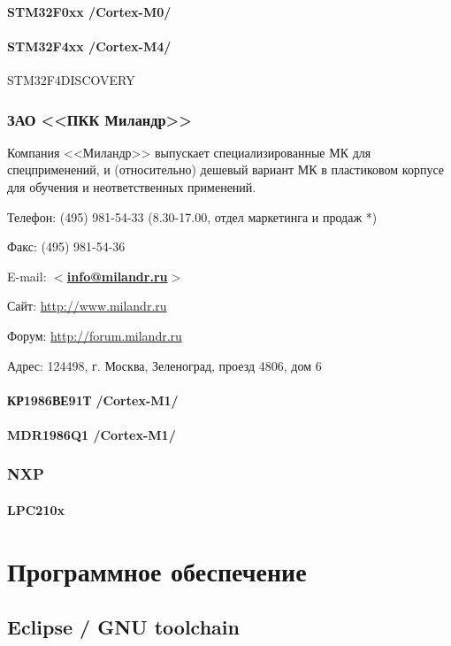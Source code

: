 \documentclass[oneside,12pt]{book}
\newcommand{\cm}[1]{Cortex-M#1}
\newcommand{\email}[1]{$<$\href{mailto:#1}{\textbf{#1}}$>$}
\begin{document}
\subsection{STM32F0xx /\cm{0}/}

\subsection{STM32F4xx /\cm{4}/} STM32F4DISCOVERY
\section{ЗАО <<ПКК Миландр>>}

Компания <<Миландр>> выпускает специализированные МК для спецприменений,
и (относительно) дешевый вариант МК в пластиковом корпусе для обучения
и неответственных применений.

\bigskip

Телефон: (495) 981-54-33 (8.30-17.00, отдел маркетинга и продаж *)

Факс: (495) 981-54-36

E-mail: \email{info@milandr.ru}

Сайт: \url{http://www.milandr.ru}

Форум: \url{http://forum.milandr.ru}

Адрес: 124498, г. Москва, Зеленоград, проезд 4806, дом 6

\subsection{КР1986ВЕ91Т /\cm{1}/}
\subsection{MDR1986Q1 /\cm{1}/}
\section{NXP}
\subsection{LPC210x}

\part{Программное обеспечение}


\chapter{Eclipse / GNU toolchain}
\end{document}
